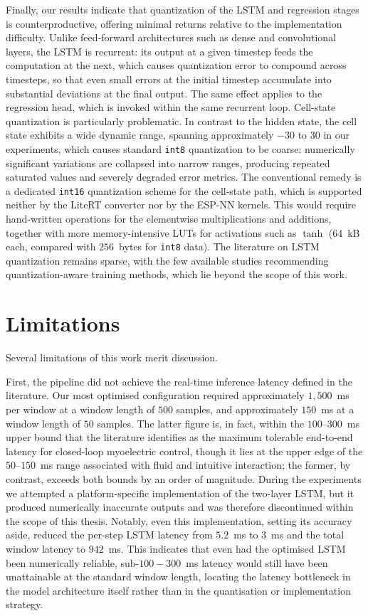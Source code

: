 \documentclass[12pt,DIV16,BCOR12mm,a4paper,footinclude=false,headinclude,parskip=half-,twoside,openright,cleardoublepage=empty,toc=index,bibliography=totoc,listof=totoc]{scrreprt}
\numberwithin{equation}{chapter}
\begin{document}
  Finally, our results indicate that quantization of the LSTM and regression stages
  is counterproductive, offering minimal returns relative to the implementation
  difficulty. Unlike feed-forward architectures such as dense and convolutional
  layers, the LSTM is recurrent: its output at a given timestep feeds the
  computation at the next, which causes quantization error to compound across
  timesteps, so that even small errors at the initial timestep accumulate into
  substantial deviations at the final output. The same effect applies to the
  regression head, which is invoked within the same recurrent loop. Cell-state
  quantization is particularly problematic. In contrast to the hidden state, the
  cell state exhibits a wide dynamic range, spanning approximately $-30$ to $30$ in
  our experiments, which causes standard \texttt{int8} quantization to be coarse:
  numerically significant variations are collapsed into narrow ranges, producing
  repeated saturated values and severely degraded error metrics. The conventional
  remedy is a dedicated \texttt{int16} quantization scheme for the cell-state path,
  which is supported neither by the LiteRT converter nor by the ESP-NN kernels. This
  would require hand-written operations for the elementwise multiplications and
  additions, together with more memory-intensive LUTs for activations such as
  $\tanh$ ($64$~kB each, compared with $256$~bytes for \texttt{int8} data). The
  literature on LSTM quantization remains sparse, with the few available studies
  recommending quantization-aware training methods, which lie beyond the scope of
  this work.

  \section{Limitations}
  Several limitations of this work merit discussion.

  First, the pipeline did not achieve the real-time inference latency defined in the
  literature. Our most optimised configuration required approximately $1{,}500$~ms per
  window at a window length of $500$ samples, and approximately $150$~ms at a window
  length of $50$ samples. The latter figure is, in fact, within the $100$--$300$~ms
  upper bound that the literature identifies as the maximum tolerable end-to-end latency
  for closed-loop myoelectric control, though it lies at the upper edge of the
  $50$--$150$~ms range associated with fluid and intuitive interaction; the former,
  by contrast, exceeds both bounds by an order of magnitude. During the experiments we attempted
  a platform-specific implementation of the two-layer LSTM, but it produced numerically inaccurate
  outputs and was therefore discontinued within the scope of this thesis. Notably, even this
  implementation, setting its accuracy aside, reduced the per-step LSTM latency from
  $5.2$~ms to $3$~ms and the total window latency to $942$~ms. This indicates that even
  had the optimised LSTM been numerically reliable, sub-$100-300$~ms latency would still have
  been unattainable at the standard window length, locating the latency bottleneck in the
  model architecture itself rather than in the quantisation or implementation strategy.
\end{document}
